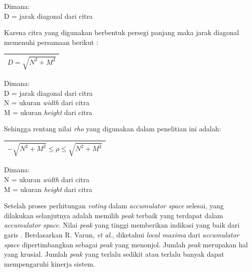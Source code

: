 \noindent Dimana:\\
D = jarak diagonal dari citra

\noindent Karena citra yang digunakan berbentuk persegi panjang maka jarak diagonal memenuhi persamaan berikut \cite{rectangle}:

\begin{table}[H]
	\begin{adjustbox}{width=1\textwidth}
		\begin{tabular}{|p{13.55cm}|}
			\hline
			\begin{equation}
			D = \sqrt{N^2 + M^2}
			\end{equation}\\
			\hline
		\end{tabular}
	\end{adjustbox}
\end{table}

\noindent Dimana:\\
D = jarak diagonal dari citra\\
N = ukuran \textit{width} dari citra\\
M = ukuran \textit{height} dari citra

\noindent Sehingga rentang nilai \textit{rho} yang digunakan dalam penelitian ini adalah:

\begin{table}[H]
	\begin{adjustbox}{width=1\textwidth}
		\begin{tabular}{|p{13.55cm}|}
			\hline
			\begin{equation}
			-\sqrt{N^2 + M^2} \leq \rho \leq \sqrt{N^2 + M^2}
			\end{equation}\\
			\hline
		\end{tabular}
	\end{adjustbox}
\end{table}

\noindent Dimana:\\
N = ukuran \textit{width} dari citra\\
M = ukuran \textit{height} dari citra

\noindent Setelah proses perhitungan \textit{voting} dalam \textit{accumulator space} selesai, yang dilakukan selanjutnya adalah memilih \textit{peak} terbaik yang terdapat dalam \textit{accumulator space}. Nilai \textit{peak} yang tinggi memberikan indikasi yang baik dari garis \cite{oechsle}. Berdasarkan R. Varun, \textit{et al}., diketahui \textit{local maxima} dari \textit{accumulator space} dipertimbangkan sebagai \textit{peak} yang menonjol. Jumlah \textit{peak} merupakan hal yang krusial. Jumlah \textit{peak} yang terlalu sedikit atau terlalu banyak dapat mempengaruhi kinerja sistem.

